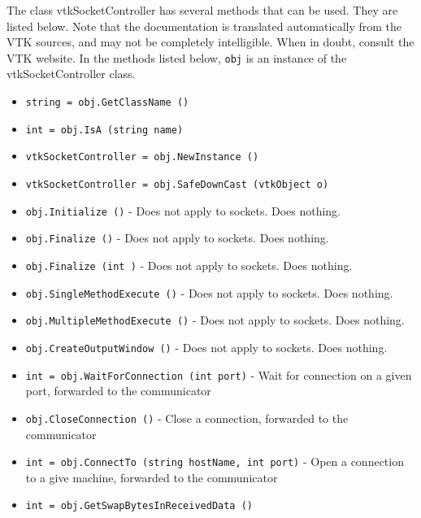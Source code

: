 The class vtkSocketController has several methods that can be used.
  They are listed below.
Note that the documentation is translated automatically from the VTK sources,
and may not be completely intelligible.  When in doubt, consult the VTK website.
In the methods listed below, \verb|obj| is an instance of the vtkSocketController class.
\begin{itemize}
\item  \verb|string = obj.GetClassName ()|

\item  \verb|int = obj.IsA (string name)|

\item  \verb|vtkSocketController = obj.NewInstance ()|

\item  \verb|vtkSocketController = obj.SafeDownCast (vtkObject o)|

\item  \verb|obj.Initialize ()| -  Does not apply to sockets. Does nothing.

\item  \verb|obj.Finalize ()| -  Does not apply to sockets. Does nothing.

\item  \verb|obj.Finalize (int )| -  Does not apply to sockets. Does nothing.

\item  \verb|obj.SingleMethodExecute ()| -   Does not apply to sockets. Does nothing.

\item  \verb|obj.MultipleMethodExecute ()| -   Does not apply to sockets.  Does nothing.

\item  \verb|obj.CreateOutputWindow ()| -   Does not apply to sockets. Does nothing.

\item  \verb|int = obj.WaitForConnection (int port)| -  Wait for connection on a given port, forwarded
 to the communicator

\item  \verb|obj.CloseConnection ()| -  Close a connection, forwarded
 to the communicator

\item  \verb|int = obj.ConnectTo (string hostName, int port)| -  Open a connection to a give machine, forwarded
 to the communicator

\item  \verb|int = obj.GetSwapBytesInReceivedData ()|


\end{itemize}
